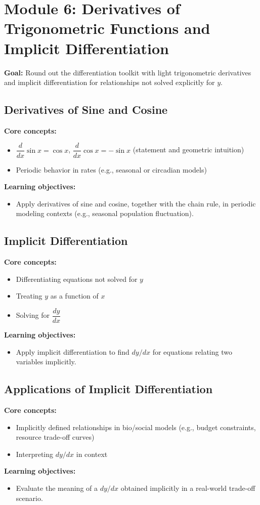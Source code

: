 \documentclass{article}
\begin{document}
\section{Module 6: Derivatives of Trigonometric Functions and Implicit Differentiation}
\textbf{Goal:} Round out the differentiation toolkit with light trigonometric derivatives and implicit differentiation for relationships not solved explicitly for $y$.

\subsection{Derivatives of Sine and Cosine}
\textbf{Core concepts:}
\begin{itemize}[leftmargin=*]
  \item $\dfrac{d}{dx}\sin x = \cos x$, $\dfrac{d}{dx}\cos x = -\sin x$ (statement and geometric intuition)
  \item Periodic behavior in rates (e.g., seasonal or circadian models)
\end{itemize}
\textbf{Learning objectives:}
\begin{itemize}[leftmargin=*]
  \item Apply derivatives of sine and cosine, together with the chain rule, in periodic modeling contexts (e.g., seasonal population fluctuation).
\end{itemize}

\subsection{Implicit Differentiation}
\textbf{Core concepts:}
\begin{itemize}[leftmargin=*]
  \item Differentiating equations not solved for $y$
  \item Treating $y$ as a function of $x$
  \item Solving for $\dfrac{dy}{dx}$
\end{itemize}
\textbf{Learning objectives:}
\begin{itemize}[leftmargin=*]
  \item Apply implicit differentiation to find $dy/dx$ for equations relating two variables implicitly.
\end{itemize}

\subsection{Applications of Implicit Differentiation}
\textbf{Core concepts:}
\begin{itemize}[leftmargin=*]
  \item Implicitly defined relationships in bio/social models (e.g., budget constraints, resource trade-off curves)
  \item Interpreting $dy/dx$ in context
\end{itemize}
\textbf{Learning objectives:}
\begin{itemize}[leftmargin=*]
  \item Evaluate the meaning of a $dy/dx$ obtained implicitly in a real-world trade-off scenario.
\end{itemize}
\end{document}
